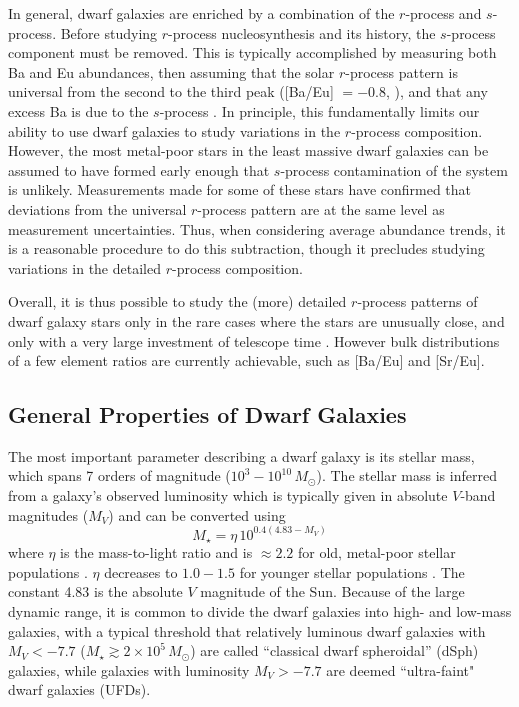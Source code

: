 \documentclass[letterpaper]{article}
\begin{document}
In general, dwarf galaxies are enriched by a combination of the $r$-process and $s$-process.
Before studying $r$-process nucleosynthesis and its history, the $s$-process component must be removed. This is typically accomplished by measuring both Ba and Eu abundances, then assuming that the solar $r$-process pattern is universal from the second to the third peak ([Ba/Eu] $= -0.8$, \citealt{Sneden2008}), and that any excess Ba is due to the $s$-process \citep[e.g.,][]{Duggan2018,Skuladottir2019,delosReyes2022}.
In principle, this fundamentally limits our ability to use dwarf galaxies to study variations in the $r$-process composition.
However, the most metal-poor stars in the least massive dwarf galaxies can be assumed to have formed early enough that $s$-process contamination of the system is unlikely. Measurements made for some of these stars have confirmed that deviations from the universal $r$-process pattern are at the same level as measurement uncertainties. Thus, when considering average abundance trends, it is a reasonable procedure to do this subtraction, though it precludes studying variations in the detailed $r$-process composition.

Overall, it is thus possible to study the (more) detailed $r$-process patterns of dwarf galaxy stars only in the rare cases where the stars are unusually close, and only with a very large investment of telescope time \citep[e.g.,][]{Ji2018,Hansen2021}.
However bulk distributions of a few element ratios are currently achievable, such as [Ba/Eu] and [Sr/Eu].


\subsection{General Properties of Dwarf Galaxies}



The most important parameter describing a dwarf galaxy is its stellar mass, which spans 7 orders of magnitude ($10^3 - 10^{10}\,M_\odot$). The stellar mass is inferred from a galaxy's observed luminosity which is typically given in absolute $V$-band magnitudes ($M_V$) and can be converted using
\begin{equation}\label{eq:mstarmv}
    M_\star = \eta\,10^{0.4(4.83 - M_V)}
\end{equation}
where $\eta$ is the mass-to-light ratio and is $\approx 2.2$ for old, metal-poor stellar populations  \citep{Ji2016b}. $\eta$ decreases to $1.0-1.5$ for younger stellar populations \citep{Kirby2013}.
The constant 4.83 is the absolute $V$ magnitude of the Sun.
Because of the large dynamic range, it is common to divide the dwarf galaxies into high- and low-mass galaxies, with a typical threshold that relatively luminous dwarf galaxies with $M_V < -7.7$ ($M_\star \gtrsim 2 \times 10^5\,M_\odot$) are called ``classical dwarf spheroidal'' (dSph) galaxies, while galaxies with luminosity $M_V > -7.7$ are deemed ``ultra-faint" dwarf galaxies (UFDs). 
\end{document}
